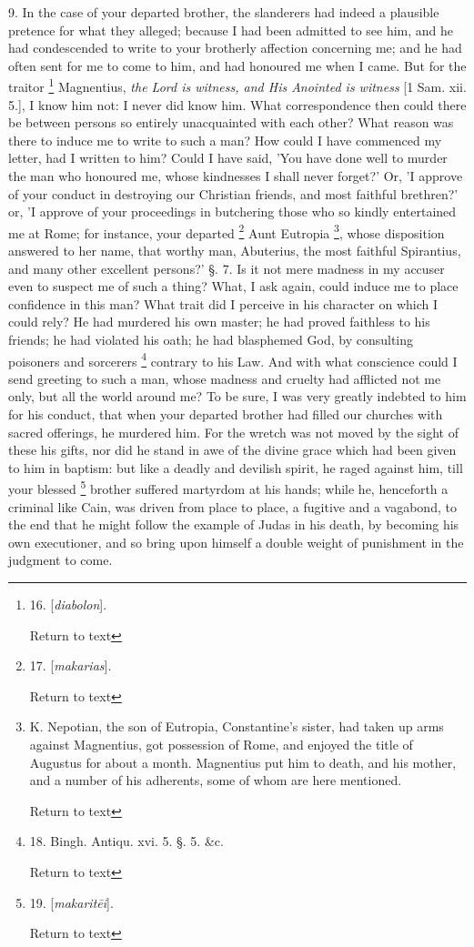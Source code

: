 9. In the case of your departed brother, the slanderers had indeed a
plausible pretence for what they alleged; because I had been admitted
to see him, and he had condescended to write to your brotherly
affection concerning me; and he had often sent for me to come to him,
and had honoured me when I came. But for the traitor \footnote{16. [\emph{diabolon}].

Return to text} Magnentius, \emph{the Lord is witness, and His
Anointed is witness} [1 Sam. xii. 5.], I know him not: I never did know
him. What correspondence then could there be between persons so
entirely unacquainted with each other? What reason was there to induce
me to write to such a man? How could I have commenced my letter, had I
written to him? Could I have said, 'You have done well to murder the
man who honoured me, whose kindnesses I shall never forget?' Or, 'I
approve of your conduct in destroying our Christian friends, and most
faithful brethren?' or, 'I approve of your proceedings in butchering
those who so kindly entertained me at Rome; for instance, your
departed \footnote{17. [\emph{makarias}].

Return to text} Aunt
Eutropia \footnote{K. Nepotian, the son of Eutropia, Constantine's sister, had taken up
arms against Magnentius, got possession of Rome, and enjoyed the title
of Augustus for about a month. Magnentius put him to death, and his
mother, and a number of his adherents, some of whom are here
mentioned.

Return to text}, whose
disposition answered to her name, that worthy man, Abuterius,
the most faithful Spirantius, and many other excellent persons?' §.
7. Is it not mere madness in my accuser even to suspect me of such a
thing? What, I ask again, could induce me to place confidence in this
man? What trait did I perceive in his character on which I could rely?
He had murdered his own master; he had proved faithless to his
friends; he had violated his oath; he had blasphemed God, by
consulting poisoners and sorcerers \footnote{18. Bingh. Antiqu. xvi. 5. §. 5. \&c.

Return to text} contrary to his Law. And with what conscience could I send
greeting to such a man, whose madness and cruelty had afflicted not me
only, but all the world around me? To be sure, I was very greatly
indebted to him for his conduct, that when your departed brother had
filled our churches with sacred offerings, he murdered him. For the
wretch was not moved by the sight of these his gifts, nor did he stand
in awe of the divine grace which had been given to him in baptism: but
like a deadly and devilish spirit, he raged against him, till your
blessed \footnote{19. [\emph{makarit\={e}i}].

Return to text} brother
suffered martyrdom at his hands; while he, henceforth a criminal like
Cain, was driven from place to place, a fugitive and a vagabond, to
the end that he might follow the example of Judas in his death, by
becoming his own executioner, and so bring upon himself a double
weight of punishment in the judgment to come.


